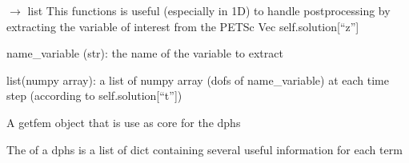 \documentclass[letterpaper,10pt,english]{sphinxmanual}
\begin{document}
\begin{fulllineitems}

\begin{fulllineitems}
\label{\detokenize{scrimp:scrimp.dphs.DPHS.get_solution}}
\pysigstartsignatures
\pysiglinewithargsret
{}
{}
{{ $\rightarrow$ list}}
\pysigstopsignatures
\sphinxAtStartPar
This functions is useful (especially in 1D) to handle post\sphinxhyphen{}processing
by extracting the variable of interest from the PETSc Vec self.solution{[}“z”{]}
\begin{description}
\sphinxAtStartPar
name\_variable (str): the name of the variable to extract

\sphinxAtStartPar
list(numpy array): a list of numpy array (dofs of name\_variable) at each time step (according to self.solution{[}“t”{]})

\end{description}

\end{fulllineitems}


\begin{fulllineitems}
\label{\detokenize{scrimp:scrimp.dphs.DPHS.gf_model}}
\pysigstartsignatures
\pysigline
{}
\pysigstopsignatures
\sphinxAtStartPar
A getfem  object that is use as core for the dphs

\end{fulllineitems}


\begin{fulllineitems}
\label{\detokenize{scrimp:scrimp.dphs.DPHS.hamiltonian}}
\pysigstartsignatures
\pysigline
{}
\pysigstopsignatures
\sphinxAtStartPar
The  of a dphs is a list of dict containing several useful information for each term

\end{fulllineitems}



\end{fulllineitems}
\end{document}
